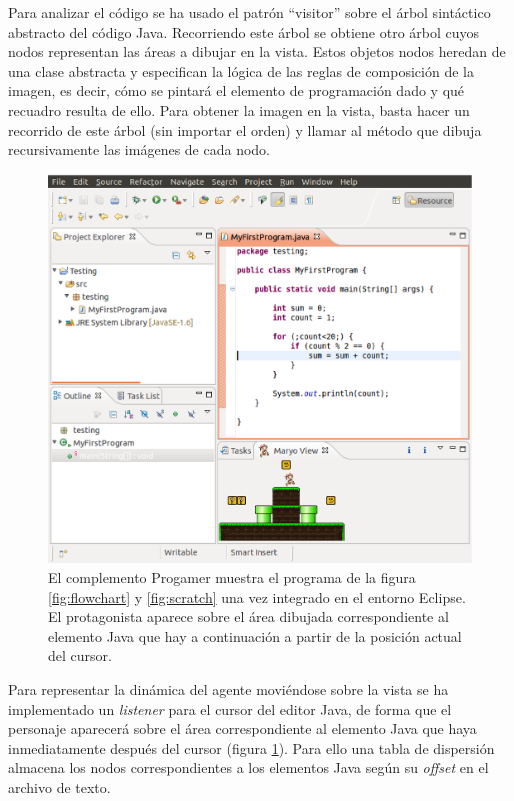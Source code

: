 \documentclass{llncs}
\begin{document}
Para analizar el código se ha usado el patrón ``visitor'' sobre el árbol sintáctico abstracto del código Java. Recorriendo este árbol se obtiene otro árbol cuyos nodos representan las áreas a dibujar en la vista. Estos objetos nodos heredan de una clase abstracta y especifican la lógica de las reglas de composición de la imagen, es decir, cómo se pintará el elemento de programación dado y qué recuadro resulta de ello. Para obtener la imagen en la vista, basta hacer un recorrido de este árbol (sin importar el orden) y llamar al método que dibuja recursivamente las imágenes de cada nodo. 

\begin{figure}[ht]
\begin{center}
\includegraphics[scale=0.5]{images/eclipse.eps}
\caption{El complemento Progamer muestra el programa de la figura \ref{fig:flowchart} y \ref{fig:scratch} una vez integrado en el entorno Eclipse. El protagonista aparece sobre el área dibujada correspondiente al elemento Java que hay a continuación a partir de la posición actual del cursor.
\label{fig:eclipse}}
\end{center}
\end{figure}

Para representar la dinámica del agente moviéndose sobre la vista se ha
implementado un {\em listener} para el cursor del editor Java, de forma que el personaje aparecerá sobre el área correspondiente al elemento Java que haya inmediatamente después del cursor (figura \ref{fig:eclipse}). Para ello una tabla de dispersión almacena los nodos correspondientes a los elementos Java según su {\em offset} en el archivo de texto.
\end{document}
